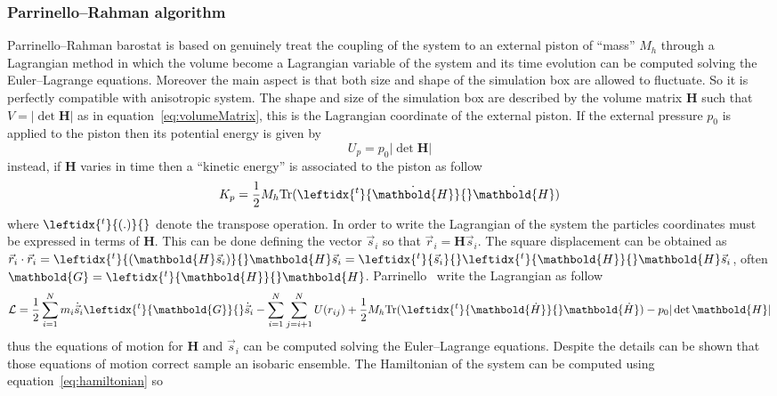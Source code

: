 \subsubsection{Parrinello--Rahman algorithm}
Parrinello--Rahman barostat \cite{ParinelloBarostat} is based on genuinely treat the coupling of the system to an external piston of ``mass'' $M_h$ through a Lagrangian method in which the volume become a Lagrangian variable of the system and its time evolution can be computed solving the Euler--Lagrange equations. Moreover the main aspect is that both size and shape of the simulation box are allowed to fluctuate. So it is perfectly compatible with anisotropic system. The shape and size of the simulation box are described by the volume matrix $ \mathbold{H}$ such that $V = |\det\mathbold{H}|$ as in equation~\eqref{eq:volumeMatrix}, this is the Lagrangian coordinate of the external piston. If the external pressure $p_0$ is applied to the piston then its potential energy is given by
\begin{equation*}
	U_p = p_0 |\det  \mathbold{H}|
\end{equation*}
instead, if $ \mathbold{H}$ varies in time then a ``kinetic energy'' is associated to the piston as follow
\begin{equation*}
	K_p = \frac{1}{2}M_h \text{Tr}(\leftidx{^t}{\dot{ \mathbold{H}}}{} \dot{ \mathbold{H}} )
\end{equation*}
where $\leftidx{^t}{(.)}{}$ denote the transpose operation. In order to write the Lagrangian of the system the particles coordinates must be expressed in terms of $ \mathbold{H}$. This can be done defining the vector $\vec s_i$ so that $\vec r_i =  \mathbold{H} \vec s_i$. The square displacement can be obtained as $\vec r_i \cdot \vec r_i = \leftidx{^t}{ (\mathbold{H} \vec s_i)}{}  \mathbold{H} \vec s_i = \leftidx{^t}{\vec s_i}{} \leftidx{^t}{ \mathbold{H}}{}  \mathbold{H} \vec s_i$, often $ \mathbold{G} = \leftidx{^t}{ \mathbold{H}}{} \mathbold{H}$. Parrinello \etal\, write the Lagrangian as follow
\begin{equation*}
	\mathcal{L} = \frac{1}{2}\sum_{i=1}^N m_i \dot{\vec s}_i \leftidx{^t}{\mathbold{G}}{} \dot{\vec s}_i - \sum_{i=1}^N \sum_{j=i+1}^N U(r_{ij}) +  \frac{1}{2} M_h \text{Tr}(\leftidx{^t}{\mathbold{\dot H}}{} \mathbold{\dot H} ) -  p_0 |\det \mathbold{H}|
\end{equation*}
thus the equations of motion for $ \mathbold{H}$ and $\vec s_i$ can be computed solving the Euler--Lagrange equations. Despite the details can be shown that those equations of motion correct sample an isobaric ensemble. The Hamiltonian of the system can be computed using equation~\eqref{eq:hamiltonian} so
